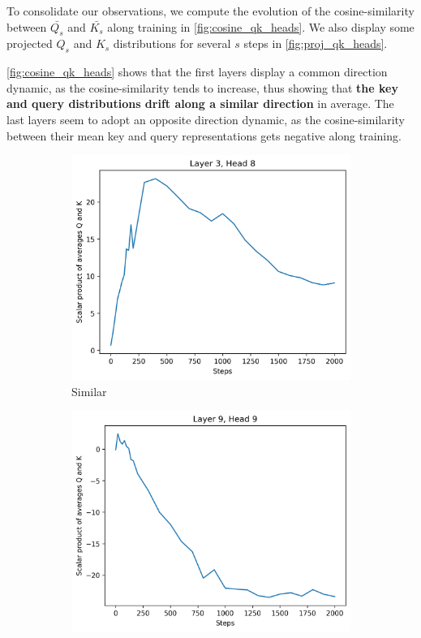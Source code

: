 To consolidate our observations, we compute the evolution of the cosine-similarity between $\bar{Q_s}$ and $\bar{K_s}$ along training in \autoref{fig:cosine_qk_heads}. We also display some projected $Q_s$ and $K_s$ distributions for several $s$ steps in \autoref{fig:proj_qk_heads}.

\autoref{fig:cosine_qk_heads} shows that the first layers display a common direction dynamic, as the cosine-similarity tends to increase, thus showing that \textbf{the key and query distributions drift along a similar direction} in average. The last layers seem to adopt an opposite direction dynamic, as the cosine-similarity between their mean key and query representations gets negative along training.

\begin{figure}[ht]
    \centering
    \begin{subfigure}[b]{0.48\columnwidth}
         \includegraphics[width=\linewidth]{sources/part_1/anisotropy/imgs/l3h8_scalar_QK.png}
         \caption{Similar}
         \label{fig:scalar_sim}
    \end{subfigure}
    \begin{subfigure}[b]{0.48\columnwidth}
         \includegraphics[width=\linewidth]{sources/part_1/anisotropy/imgs/l9h9_scalar_QK.png}

\end{subfigure}
\end{figure}
